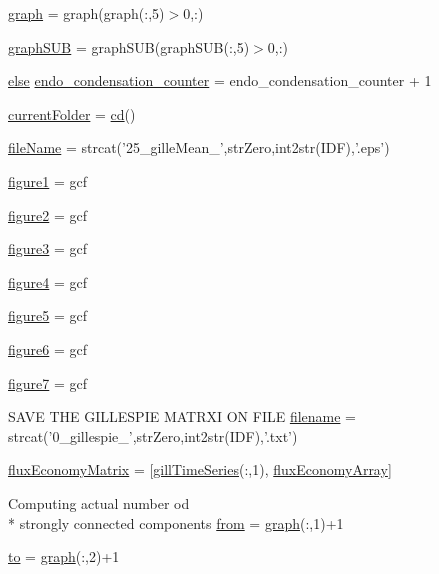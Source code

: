 \begin{DoxyCompactItemize}
\item 
\hyperlink{a00028_a91819eaefb434ac459f17b3caa03713d}{graph} = graph(graph(\-:,5)$>$0,\-:)
\item 
\hyperlink{a00028_a0c738fa68cf19f3aeef6b6a7a723577c}{graph\-S\-U\-B} = graph\-S\-U\-B(graph\-S\-U\-B(\-:,5)$>$0,\-:)
\item 
\hyperlink{a00031_af5946383720aa572eb93e1e63afc23c2}{else} \hyperlink{a00028_ac7610da79e174cac91899b5a15014265}{endo\-\_\-condensation\-\_\-counter} = endo\-\_\-condensation\-\_\-counter + 1
\item 
\hyperlink{a00028_af393966a41271e721a03e544a1650f4a}{current\-Folder} = \hyperlink{a00110_a767271ad82d244871370a0f0e6a7f8a4}{cd}()
\item 
\hyperlink{a00028_acbece2625a541230e9f9091adca38c8c}{file\-Name} = strcat('25\-\_\-gille\-Mean\-\_\-',str\-Zero,int2str(\-I\-D\-F),'.\-eps')
\item 
\hyperlink{a00028_aa04641698301ef27b9562e1a03d697cf}{figure1} = gcf
\item 
\hyperlink{a00028_a185ece7ea03635f3e9f36bce457bc6b0}{figure2} = gcf
\item 
\hyperlink{a00028_a49c05716a1aa25ef47e7b2a3cc3b7362}{figure3} = gcf
\item 
\hyperlink{a00028_a3910d94d7f9d81634d5102442e25d603}{figure4} = gcf
\item 
\hyperlink{a00028_aacba0a23b9337f688d1a0fc707f49bb8}{figure5} = gcf
\item 
\hyperlink{a00028_a6d1dba2624229e06f705f5eaa6e11a9b}{figure6} = gcf
\item 
\hyperlink{a00028_ad893b16e514321b512ee5c11fb5b7b0d}{figure7} = gcf
\item 
S\-A\-V\-E T\-H\-E G\-I\-L\-L\-E\-S\-P\-I\-E M\-A\-T\-R\-X\-I O\-N F\-I\-L\-E \hyperlink{a00028_a3982f974d3baf0c73223616526999bed}{filename} = strcat('0\-\_\-gillespie\-\_\-',str\-Zero,int2str(\-I\-D\-F),'.\-txt')
\item 
\hyperlink{a00028_a0f649e90f057db90356bf42a61b618b3}{flux\-Economy\-Matrix} = \mbox{[}\hyperlink{a00028_ac62d9b6e4b7257c90322e20e1eb8e733}{gill\-Time\-Series}(\-:,1), \hyperlink{a00028_a5d3cba9db002e77eaf6ffce66592841f}{flux\-Economy\-Array}\mbox{]}
\item 
Computing actual number od \\*
strongly connected components \hyperlink{a00028_aa7b4fe13e75a69fca72862effeaf6196}{from} = \hyperlink{a00028_a2745e24fec2a44d51f4452beb1596bd3}{graph}(\-:,1)+1
\item 
\hyperlink{a00028_af71dbe52628a3f83a77ab494817525c6}{to} = \hyperlink{a00028_a2745e24fec2a44d51f4452beb1596bd3}{graph}(\-:,2)+1

\end{DoxyCompactItemize}
